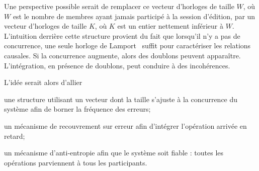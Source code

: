 Une perspective possible serait de remplacer ce vecteur d'horloges de taille
$W$, où $W$ est le nombre de membres ayant jamais participé à la session
d'édition, par un vecteur d'horloges de taille $K$, où $K$ est un entier
nettement inférieur à $W$. L'intuition derrière cette structure provient du fait
que lorsqu'il n'y a pas de concurrence, une seule horloge de
Lamport~\cite{lamport1978time} suffit pour caractériser les relations
causales. Si la concurrence augmente, alors des doublons peuvent
apparaître. L'intégration, en présence de doublons, peut conduire à des
incohérences.

L'idée serait alors d'allier
\begin{inparaenum}[(i)]
\item une structure utilisant un vecteur dont la taille s'ajuste à la
  concurrence du système afin de borner la fréquence des erreurs;
\item un mécanisme de recouvrement sur erreur afin d'intégrer l'opération
  arrivée en retard;
\item un mécanisme d'anti-entropie afin que le système soit fiable : toutes les
  opérations parviennent à tous les participants.
\end{inparaenum}




